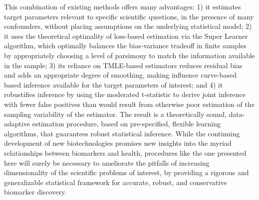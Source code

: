 This combination of existing methods offers many advantages: 1) it estimates
target parameters relevant to specific scientific questions, in the presence of
many confounders, without placing assumptions on the underlying statistical
model; 2) it uses the theoretical optimality of loss-based estimation via the
Super Learner algorithm, which optimally balances the bias-variance tradeoff in
finite samples by appropriately choosing a level of parsimony to match the
information available in the sample; 3) its reliance on TMLE-based estimators
reduces residual bias and adds an appropriate degree of smoothing, making
influence curve-based based inference available for the target parameters of
interest; and 4) it robustifies inference by using the moderated t-statistic to
derive joint inference with fewer false positives than would result from
otherwise poor estimation of the sampling variability of the estimator. The
result is a theoretically sound, data-adaptive estimation procedure, based on
pre-specified, flexible learning algorithms, that guarantees robust statistical
inference. While the continuing development of new biotechnologies promises new
insights into the myriad relationships between biomarkers and health,
procedures like the one presented here will surely be necessary to ameliorate
the pitfalls of increasing dimensionality of the scientific problems of
interest, by providing a rigorous and generalizable statistical framework for
accurate, robust, and conservative biomarker discovery.
